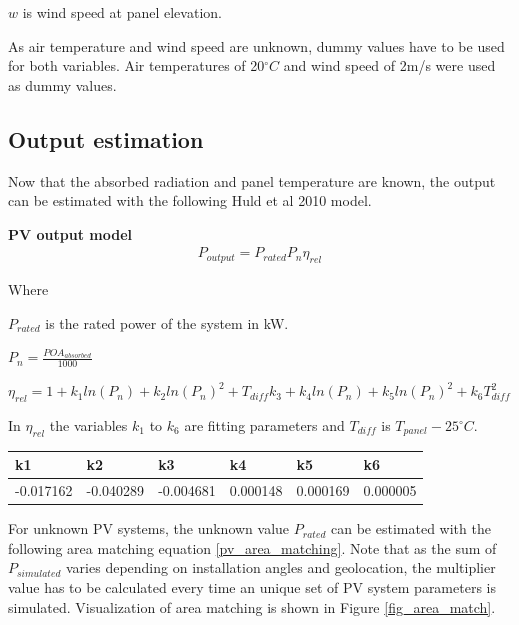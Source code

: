 $w$ is wind speed at panel elevation.


\vspace{6mm}

\noindent As air temperature and wind speed are unknown, dummy values have to be used for both variables. Air temperatures of 20$^\circ C$ and wind speed of 2m/s were used as dummy values.

\newpage
\subsection{Output estimation}
Now that the absorbed radiation and panel temperature are known, the output can be estimated with the following Huld et al 2010 model\cite{huld2010}.

\noindent\textbf{PV output model}
\begin{equation}
\begin{split}
\label{pv_output_model}
P_{output} = P_{rated}  P_n  \eta_{rel}
\end{split}
\end{equation}

\noindent Where 

$P_{rated}$ is the rated power of the system in kW.

$P_n = \frac{POA_{absorbed}}{1000}$


$\eta_{rel}= 1+k_1 ln(P_n) + k_2 ln(P_n)^2 + T_{diff}k_3 + k_4 ln(P_n) + k_5 ln(P_n)^2 + k_6 T_{diff}^2$

In $\eta_{rel}$ the variables $k_1$ to $k_6$ are fitting parameters and $T_{diff}$ is $T_{panel}-25^\circ C$.

\begin{table}[h]
\begin{tabular}{l|l|l|l|l|l}
k1        & k2        & k3        & k4       & k5       & k6       \\ \hline
-0.017162 & -0.040289 & -0.004681 & 0.000148 & 0.000169 & 0.000005
\end{tabular}
\end{table}

\noindent %
For unknown PV systems, the unknown value $P_{rated}$ can be estimated with the following area matching equation \ref{pv_area_matching}. Note that as the sum of $P_{simulated}$ varies depending on installation angles and geolocation, the multiplier value has to be calculated every time an unique set of PV system parameters is simulated. Visualization of area matching is shown in Figure \ref{fig_area_match}.


